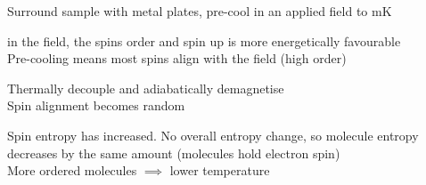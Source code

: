 \documentclass[a4paper, 11pt, normalem]{report}
\begin{document}
Surround sample with metal plates, pre-cool in an applied field to mK

in the field, the spins order and spin up is more energetically favourable \\
Pre-cooling means most spins align with the field (high order)

Thermally decouple and adiabatically demagnetise \\
Spin alignment becomes random

Spin entropy has increased. No overall entropy change, so molecule entropy decreases by the same amount (molecules hold electron spin) \\
More ordered molecules $\implies$ lower temperature
\end{document}
